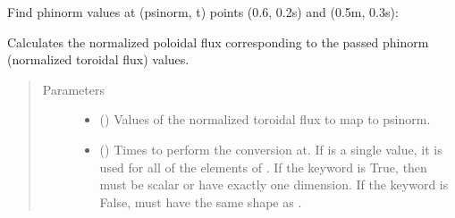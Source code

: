 \documentclass[letterpaper,10pt,english]{sphinxmanual}
\begin{document}
\begin{fulllineitems}
\begin{fulllineitems}
Find phinorm values at (psinorm, t) points (0.6, 0.2s) and (0.5m, 0.3s):

\begin{sphinxVerbatim}[commandchars=\\\{\}]
   \PYG{p}{[} \PYG{p}{]} \PYG{p}{[} \PYG{p}{]} 
\end{sphinxVerbatim}

\end{fulllineitems}


\begin{fulllineitems}
\label{\detokenize{eqtools:eqtools.core.Equilibrium.phinorm2psinorm}}
Calculates the normalized poloidal flux corresponding to the passed phinorm (normalized toroidal flux) values.
\begin{quote}\begin{description}
\item[{Parameters}] \leavevmode\begin{itemize}
\item {} 
 () \textendash{} Values of the normalized
toroidal flux to map to psinorm.

\item {} 
 () \textendash{} Times to perform the conversion at.
If  is a single value, it is used for all of the elements of
. If the  keyword is True, then  must be scalar
or have exactly one dimension. If the  keyword is False,
 must have the same shape as .


\end{itemize}
\end{description}
\end{quote}
\end{fulllineitems}
\end{fulllineitems}
\end{document}
